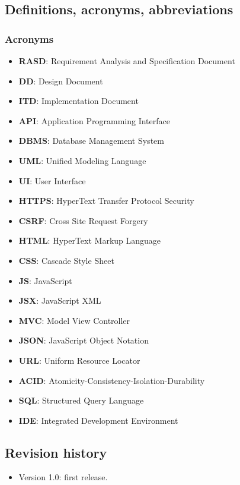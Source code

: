 \documentclass[table, 12pt]{article}
\begin{document}
\subsection{Definitions, acronyms, abbreviations}
\subsubsection*{Acronyms}
\begin{itemize}
    \item \textbf{RASD}: Requirement Analysis and Specification Document
    \item \textbf{DD}: Design Document
    \item \textbf{ITD}: Implementation Document
    \item \textbf{API}: Application Programming Interface
    \item \textbf{DBMS}: Database Management System
    \item \textbf{UML}: Unified Modeling Language
    \item \textbf{UI}: User Interface
    \item \textbf{HTTPS}: HyperText Transfer Protocol Security
    \item \textbf{CSRF}: Cross Site Request Forgery
    \item \textbf{HTML}: HyperText Markup Language
    \item \textbf{CSS}: Cascade Style Sheet
    \item \textbf{JS}: JavaScript
    \item \textbf{JSX}: JavaScript XML
    \item \textbf{MVC}: Model View Controller
    \item \textbf{JSON}: JavaScript Object Notation
    \item \textbf{URL}: Uniform Resource Locator
    \item \textbf{ACID}: Atomicity-Consistency-Isolation-Durability
    \item \textbf{SQL}: Structured Query Language
    \item \textbf{IDE}: Integrated Development Environment
\end{itemize}

\subsection{Revision history}
\begin{itemize}
    \item Version 1.0: first release.
    
\end{itemize}
\end{document}
